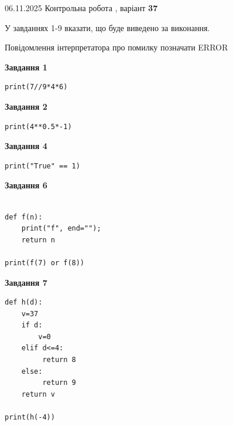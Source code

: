\documentclass[12pt, ukrainian]{article}
\begin{document}
{\Large{06.11.2025 Контрольна робота , варіант  \No \textbf { 37 }\par}}
{
\begin {large}
У завданнях 1-9 вказати, що буде виведено за виконання.

Повідомлення інтерпретатора про помилку позначати ERROR

\begin{minipage}[t]{7.5cm}

\begin{center}
\textbf{Завдання 1}
\end{center}

\begin{verbatim}
print(7//9*4*6)
\end{verbatim}



\begin{center}
\textbf{Завдання 2}
\end{center}

\begin{verbatim}
print(4**0.5*-1)
\end{verbatim}



\begin{center}
\textbf{Завдання 4}
\end{center}

\begin{verbatim}
print("True" == 1)
\end{verbatim}



\begin{center}
\textbf{Завдання 6}
\end{center}

\begin{verbatim}

def f(n):
    print("f", end="");
    return n

print(f(7) or f(8))
\end{verbatim}



\begin{center}
\textbf{Завдання 7}
\end{center}

\begin{verbatim}
def h(d):
    v=37
    if d: 
        v=0
    elif d<=4:
         return 8
    else:
         return 9
    return v

print(h(-4))
\end{verbatim}


\end{minipage}
\end{large}}
\end{document}
